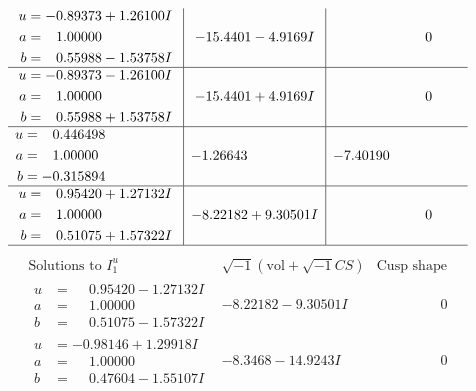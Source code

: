 \documentclass[1p]{elsarticle_modified}
\theoremstyle{definition}
\newcommand{\I}{\sqrt{-1}}
\begin{document}
$$\begin{array}{c|c|c}
\begin{aligned}
u &= -0.89373 + 1.26100 I \\
a &= \phantom{-}1.00000\phantom{ +0.000000I} \\
b &= \phantom{-}0.55988 - 1.53758 I\end{aligned}
 & -15.4401 - 4.9169 I & \phantom{-0.000000 } 0 \\ \hline\begin{aligned}
u &= -0.89373 - 1.26100 I \\
a &= \phantom{-}1.00000\phantom{ +0.000000I} \\
b &= \phantom{-}0.55988 + 1.53758 I\end{aligned}
 & -15.4401 + 4.9169 I & \phantom{-0.000000 } 0 \\ \hline\begin{aligned}
u &= \phantom{-}0.446498\phantom{ +0.000000I} \\
a &= \phantom{-}1.00000\phantom{ +0.000000I} \\
b &= -0.315894\phantom{ +0.000000I}\end{aligned}
 & -1.26643\phantom{ +0.000000I} & -7.40190\phantom{ +0.000000I} \\ \hline\begin{aligned}
u &= \phantom{-}0.95420 + 1.27132 I \\
a &= \phantom{-}1.00000\phantom{ +0.000000I} \\
b &= \phantom{-}0.51075 + 1.57322 I\end{aligned}
 & -8.22182 + 9.30501 I & \phantom{-0.000000 } 0\\
 \hline 
 \end{array}$$\newpage$$\begin{array}{c|c|c}  
\text{Solutions to }I^u_{1}& \I (\text{vol} + \sqrt{-1}CS) & \text{Cusp shape}\\
 \hline 
\begin{aligned}
u &= \phantom{-}0.95420 - 1.27132 I \\
a &= \phantom{-}1.00000\phantom{ +0.000000I} \\
b &= \phantom{-}0.51075 - 1.57322 I\end{aligned}
 & -8.22182 - 9.30501 I & \phantom{-0.000000 } 0 \\ \hline\begin{aligned}
u &= -0.98146 + 1.29918 I \\
a &= \phantom{-}1.00000\phantom{ +0.000000I} \\
b &= \phantom{-}0.47604 - 1.55107 I\end{aligned}
 & -8.3468 - 14.9243 I & \phantom{-0.000000 } 0 \\ \hline\begin{aligned}

\end{aligned}
\end{array}$$
\end{document}

